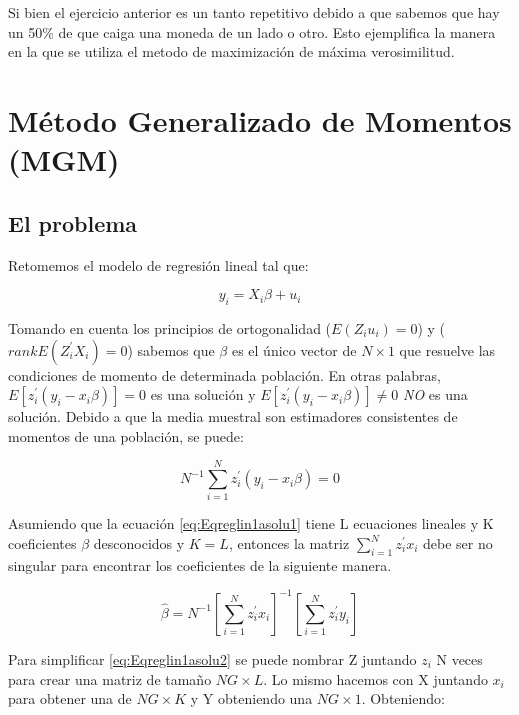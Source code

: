 \documentclass[
]{book}
\begin{document}
Si bien el ejercicio anterior es un tanto repetitivo debido a que sabemos que hay un 50\% de que caiga una moneda de un lado o otro. Esto ejemplifica la manera en la que se utiliza el metodo de maximización de máxima verosimilitud.

\hypertarget{muxe9todo-generalizado-de-momentos-mgm}{%
\chapter{Método Generalizado de Momentos (MGM)}\label{muxe9todo-generalizado-de-momentos-mgm}}

\hypertarget{el-problema-2}{%
\section{El problema}\label{el-problema-2}}

Retomemos el modelo de regresión lineal tal que:

\begin{equation}
y_i=X_i\beta+u_i
    \label{Eq_reglin}
\end{equation}

Tomando en cuenta los principios de ortogonalidad (\(E(Z_iu_i)=0\)) y (\(rankE(Z_i^{'}X_i)=0\)) sabemos que \(\beta\) es el único vector de \(N\times1\) que resuelve las condiciones de momento de determinada población. En otras palabras, \(E[z_i^{'}(y_i-x_i\beta)]=0\) es una solución y \(E[z_i^{'}(y_i-x_i\beta)]\neq0\) \emph{NO} es una solución. Debido a que la media muestral son estimadores consistentes de momentos de una población, se puede:

\begin{equation}
N^{-1}\sum_{i=1}^{N}z_i^{'}(y_i-x_i\beta)=0
\label{eq:Eqreglin1asolu1}
\end{equation}

Asumiendo que la ecuación \eqref{eq:Eqreglin1asolu1} tiene L ecuaciones lineales y K coeficientes \(\beta\) desconocidos y \(K=L\), entonces la matriz \(\sum_{i=1}^{N}z_i^{'}x_i\) debe ser no singular para encontrar los coeficientes de la siguiente manera.

\begin{equation}
\hat{\beta}=N^{-1}\left[\sum_{i=1}^{N}z_i^{'}x_i\right]^{-1}\left[\sum_{i=1}^{N}z_i^{'}y_i\right]
\label{eq:Eqreglin1asolu2}
\end{equation}

Para simplificar \eqref{eq:Eqreglin1asolu2} se puede nombrar Z juntando \(z_i\) N veces para crear una matriz de tamaño \(NG\times L\). Lo mismo hacemos con X juntando \(x_i\) para obtener una de \(NG\times K\) y Y obteniendo una \(NG\times 1\). Obteniendo:
\end{document}
